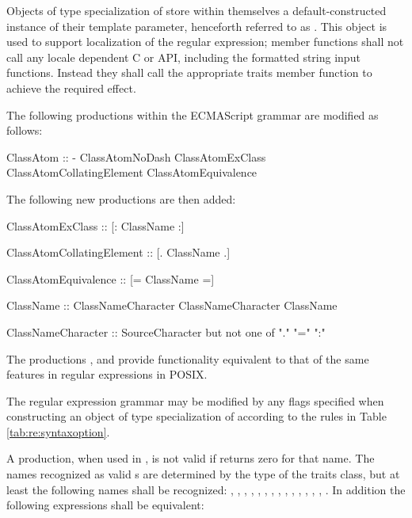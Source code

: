 \pnum
{}%
%
Objects of type specialization of  store within themselves a
default-constructed instance of their  template parameter, henceforth
referred to as . This  object is used to support localization
of the regular expression;  member functions shall not call
any locale dependent C or \Cpp API, including the formatted string input functions.
Instead they shall call the appropriate traits member function to achieve the required effect.

\pnum
The following productions within the ECMAScript grammar are modified as follows:

\begin{codeblock}
ClassAtom ::
  -
  ClassAtomNoDash
  ClassAtomExClass
  ClassAtomCollatingElement
  ClassAtomEquivalence
\end{codeblock}

\pnum
The following new productions are then added:

\begin{codeblock}
ClassAtomExClass ::
  [: ClassName :]

ClassAtomCollatingElement ::
  [. ClassName .]

ClassAtomEquivalence ::
  [= ClassName =]

ClassName ::
  ClassNameCharacter
  ClassNameCharacter ClassName

ClassNameCharacter ::
  SourceCharacter but not one of "." "=" ":"
\end{codeblock}

\pnum
The productions , 
and  provide functionality
equivalent to that of the same features in regular expressions in POSIX.

\pnum
The regular expression grammar may be modified by
any  flags specified when
constructing an object of type specialization of 
according to the rules in Table \ref{tab:re:syntaxoption}.

\pnum
A  production, when used in ,
is not valid if  returns zero for
that name.  The names recognized as valid s are
determined by the type of the traits class, but at least the following
names shall be recognized: 
, , , , , 
, , , , , 
, , , , .
In addition the following expressions shall be equivalent:

